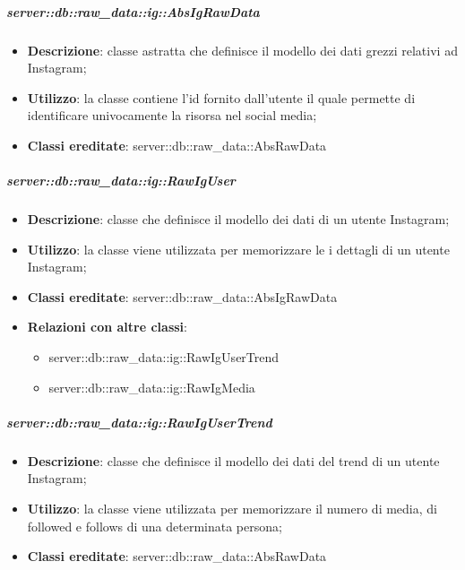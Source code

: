 		\subparagraph{server::db::raw\_data::ig::AbsIgRawData} %
		\label{subp:server_db_raw_data_ig_absigrawdata}
			\begin{itemize}
				\item \textbf{Descrizione}: classe astratta che definisce il modello dei dati grezzi relativi ad Instagram;
				\item \textbf{Utilizzo}: la classe contiene l'id fornito dall'utente il quale permette di identificare univocamente la risorsa nel social media;
				\item \textbf{Classi ereditate}: server::db::raw\_data::AbsRawData
			\end{itemize}


		\subparagraph{server::db::raw\_data::ig::RawIgUser} %
		\label{subp:server_db_raw_data_ig_rawiguser}
			\begin{itemize}
				\item \textbf{Descrizione}: classe che definisce il modello dei dati di un utente Instagram;
				\item \textbf{Utilizzo}:  la classe viene utilizzata per memorizzare le i dettagli di un utente Instagram;
				\item \textbf{Classi ereditate}: server::db::raw\_data::AbsIgRawData
				\item \textbf{Relazioni con altre classi}:
					\begin{itemize}
						\item server::db::raw\_data::ig::RawIgUserTrend
						\item server::db::raw\_data::ig::RawIgMedia
					\end{itemize}
			\end{itemize}


		\subparagraph{server::db::raw\_data::ig::RawIgUserTrend} %
		\label{subp:server_db_raw_data_ig_rawigusertrend}
			\begin{itemize}
				\item \textbf{Descrizione}: classe che definisce il modello dei dati del trend di un utente Instagram;
				\item \textbf{Utilizzo}: la classe viene utilizzata per memorizzare il numero di media, di followed e follows di una determinata persona;
				\item \textbf{Classi ereditate}: server::db::raw\_data::AbsRawData
			\end{itemize}


